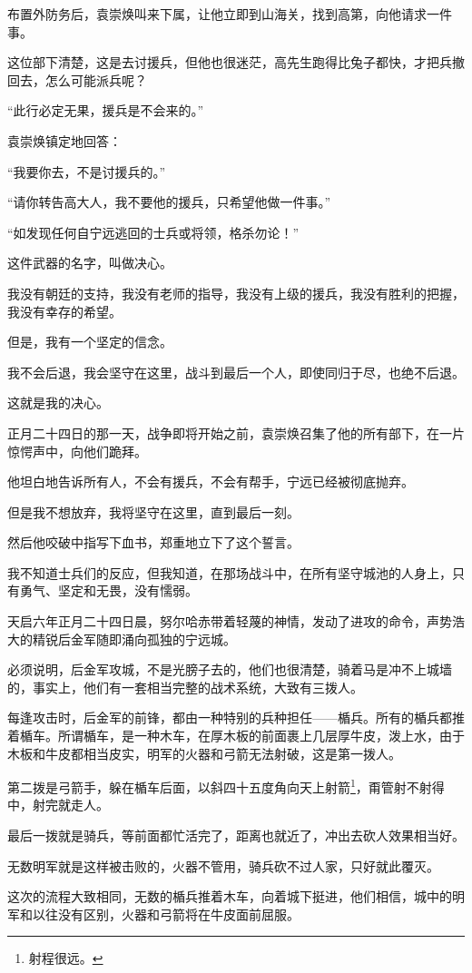 \begin{multicols}{\theparacolNo}
布置外防务后，袁崇焕叫来下属，让他立即到山海关，找到高第，向他请求一件事。

这位部下清楚，这是去讨援兵，但他也很迷茫，高先生跑得比兔子都快，才把兵撤回去，怎么可能派兵呢？

“此行必定无果，援兵是不会来的。”

袁崇焕镇定地回答：

“我要你去，不是讨援兵的。”

“请你转告高大人，我不要他的援兵，只希望他做一件事。”

“如发现任何自宁远逃回的士兵或将领，格杀勿论！”

这件武器的名字，叫做决心。

我没有朝廷的支持，我没有老师的指导，我没有上级的援兵，我没有胜利的把握，我没有幸存的希望。

但是，我有一个坚定的信念。

我不会后退，我会坚守在这里，战斗到最后一个人，即使同归于尽，也绝不后退。

这就是我的决心。

正月二十四日的那一天，战争即将开始之前，袁崇焕召集了他的所有部下，在一片惊愕声中，向他们跪拜。

他坦白地告诉所有人，不会有援兵，不会有帮手，宁远已经被彻底抛弃。

但是我不想放弃，我将坚守在这里，直到最后一刻。

然后他咬破中指写下血书，郑重地立下了这个誓言。

我不知道士兵们的反应，但我知道，在那场战斗中，在所有坚守城池的人身上，只有勇气、坚定和无畏，没有懦弱。

天启六年正月二十四日晨，努尔哈赤带着轻蔑的神情，发动了进攻的命令，声势浩大的精锐后金军随即涌向孤独的宁远城。

必须说明，后金军攻城，不是光膀子去的，他们也很清楚，骑着马是冲不上城墙的，事实上，他们有一套相当完整的战术系统，大致有三拨人。

每逢攻击时，后金军的前锋，都由一种特别的兵种担任——楯兵。所有的楯兵都推着楯车。所谓楯车，是一种木车，在厚木板的前面裹上几层厚牛皮，泼上水，由于木板和牛皮都相当皮实，明军的火器和弓箭无法射破，这是第一拨人。

第二拨是弓箭手，躲在楯车后面，以斜四十五度角向天上射箭\footnote{射程很远。}，甭管射不射得中，射完就走人。

最后一拨就是骑兵，等前面都忙活完了，距离也就近了，冲出去砍人效果相当好。

无数明军就是这样被击败的，火器不管用，骑兵砍不过人家，只好就此覆灭。

这次的流程大致相同，无数的楯兵推着木车，向着城下挺进，他们相信，城中的明军和以往没有区别，火器和弓箭将在牛皮面前屈服。


\end{multicols}
